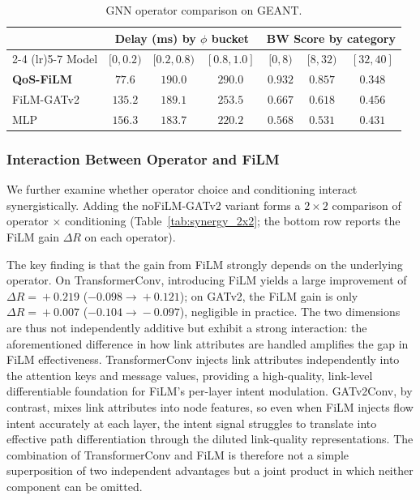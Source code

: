 \begin{table}[t]
\centering
\caption{GNN operator comparison on GEANT.}
\label{tab:bucketed_combined}
\setlength{\tabcolsep}{3pt}
\begin{tabular}{lccc|ccc}
\toprule
& \multicolumn{3}{c}{Delay (ms) by $\phi$ bucket} & \multicolumn{3}{c}{BW Score by category} \\
\cmidrule(lr){2-4} \cmidrule(lr){5-7}
Model & $[0,0.2)$ & $[0.2,0.8)$ & $[0.8,1.0]$ & $[0,8)$ & $[8,32)$ & $[32,40]$ \\
\midrule
\textbf{QoS-FiLM} & $\mathbf{77.6}$ & $190.0$ & $290.0$ & $\mathbf{0.932}$ & $\mathbf{0.857}$ & $0.348$ \\
FiLM-GATv2       & $135.2$ & $189.1$ & $253.5$ & $0.667$ & $0.618$ & $0.456$ \\
MLP              & $156.3$ & $183.7$ & $220.2$ & $0.568$ & $0.531$ & $0.431$ \\
\bottomrule
\end{tabular}
\end{table}

\subsubsection{Interaction Between Operator and FiLM}
\label{sec:exp:synergy}

We further examine whether operator choice and conditioning interact synergistically. Adding the noFiLM-GATv2 variant forms a $2\times2$ comparison of operator $\times$ conditioning (Table~\ref{tab:synergy_2x2}; the bottom row reports the FiLM gain $\Delta R$ on each operator).

The key finding is that the gain from FiLM strongly depends on the underlying operator. On TransformerConv, introducing FiLM yields a large improvement of $\Delta R\!=\!+0.219$ ($-0.098\!\to\!+0.121$); on GATv2, the FiLM gain is only $\Delta R\!=\!+0.007$ ($-0.104\!\to\!-0.097$), negligible in practice. The two dimensions are thus not independently additive but exhibit a strong interaction: the aforementioned difference in how link attributes are handled amplifies the gap in FiLM effectiveness. TransformerConv injects link attributes independently into the attention keys and message values, providing a high-quality, link-level differentiable foundation for FiLM's per-layer intent modulation. GATv2Conv, by contrast, mixes link attributes into node features, so even when FiLM injects flow intent accurately at each layer, the intent signal struggles to translate into effective path differentiation through the diluted link-quality representations. The combination of TransformerConv and FiLM is therefore not a simple superposition of two independent advantages but a joint product in which neither component can be omitted.

